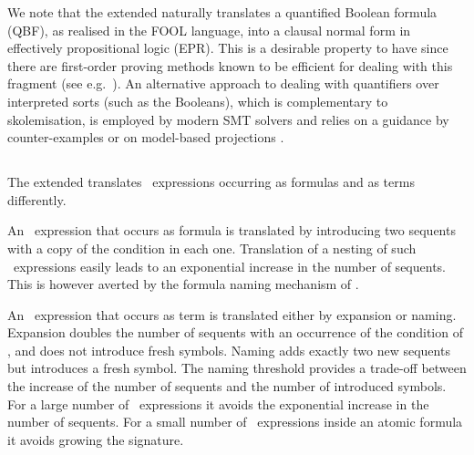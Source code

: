 We note that the extended \newcnf{} naturally translates a quantified Boolean formula (QBF),
as realised in the FOOL language, into a clausal normal form in effectively propositional logic (EPR). 
This is a desirable property to have since there are first-order proving methods 
known to be efficient for dealing with this fragment (see e.g.~\cite{DBLP:conf/birthday/Korovin13}).
An alternative approach to dealing with quantifiers over interpreted sorts (such as the Booleans), 
which is complementary to skolemisation,
is employed by modern SMT solvers and relies on a guidance by counter-examples 
\cite{DBLP:journals/corr/Reynolds0K15} or on model-based projections \cite{LPAR-20:Playing_with_Quantified_Satisfaction}.


\subsection{\ITE}
The extended \newcnf{} translates \ITE\ expressions occurring as formulas and as terms differently.

An \ITE\ expression that occurs as formula is translated by introducing two sequents with a copy of the condition in each one. Translation of a nesting of such \ITE\ expressions easily leads to an exponential increase in the number of sequents. This is however averted by the formula naming mechanism of \newcnf{}.

An \ITE\ expression that occurs as term is translated either by expansion or naming. Expansion doubles the number of sequents with an occurrence of the condition of \ITE, and does not introduce fresh symbols. Naming adds exactly two new sequents but introduces a fresh symbol. The naming threshold provides a trade-off between the increase of the number of sequents and the number of introduced symbols. For a large number of \ITE\ expressions it avoids the exponential increase in the number of sequents. For a small number of \ITE\ expressions inside an atomic formula it avoids growing the signature.

